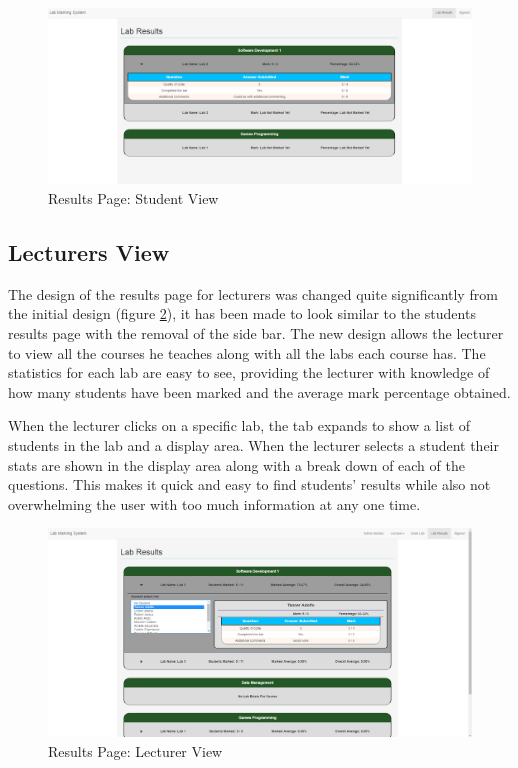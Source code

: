 \documentclass[11pt]{report}
\begin{document}
\begin{figure}[H]
    \centering
    \includegraphics[width=1\textwidth]{images/implementation/student-results-page.png}
    \caption{Results Page: Student View}
    \label{fig:results-student}
\end{figure}


\subsection*{Lecturers View} \label{sec:results-lecturer}

The design of the results page for lecturers was changed quite significantly from the initial design (figure \ref{fig:results-lecturer}), it has been made to look similar to the students results page with the removal of the side bar. The new design allows the lecturer to view all the courses he teaches along with all the labs each course has. The statistics for each lab are easy to see, providing the lecturer with knowledge of how many students have been marked and the average mark percentage obtained.

When the lecturer clicks on a specific lab, the tab expands to show a list of students in the lab and a display area. When the lecturer selects a student their stats are shown in the display area along with a break down of each of the questions. This makes it quick and easy to find students' results while also not overwhelming the user with too much information at any one time.

\begin{figure}[H]
    \centering
    \includegraphics[width=1\textwidth]{images/implementation/lecturer-results-page.png}
    \caption{Results Page: Lecturer View}
    \label{fig:results-lecturer}
\end{figure}
\end{document}
